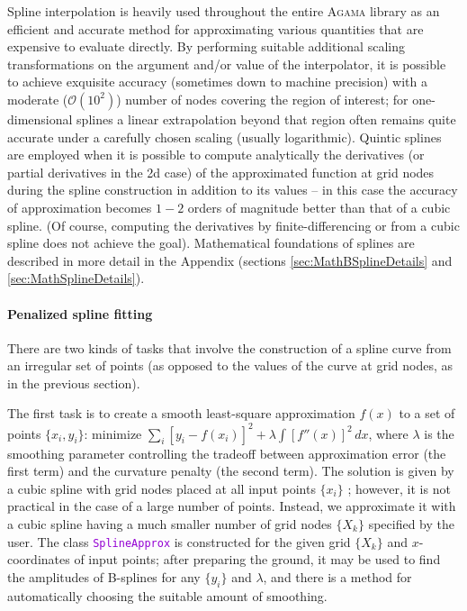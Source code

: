 \documentclass[12pt]{article}
\newcommand{\Agama}{\textsc{Agama}\xspace}
\newcommand{\ttt}[1]{\textcolor{darkviolet}{\texttt{#1}}}
\begin{document}
Spline interpolation is heavily used throughout the entire \Agama library as an efficient and accurate method for approximating various quantities that are expensive to evaluate directly. By performing suitable additional scaling transformations on the argument and/or value of the interpolator, it is possible to achieve exquisite accuracy (sometimes down to machine precision) with a moderate ($\mathcal O(10^2)$) number of nodes covering the region of interest; for one-dimensional splines a linear extrapolation beyond that region often remains quite accurate under a carefully chosen scaling (usually logarithmic). Quintic splines are employed when it is possible to compute analytically the derivatives (or partial derivatives in the 2d case) of the approximated function at grid nodes during the spline construction in addition to its values -- in this case the accuracy of approximation becomes $1-2$ orders of magnitude better than that of a cubic spline. (Of course, computing the derivatives by finite-differencing or from a cubic spline does not achieve the goal).
Mathematical foundations of splines are described in more detail in the Appendix (sections \ref{sec:MathBSplineDetails} and \ref{sec:MathSplineDetails}).

\paragraph{Penalized spline fitting}  \label{sec:SplineFitting}
There are two kinds of tasks that involve the construction of a spline curve from an irregular set of points (as opposed to the values of the curve at grid nodes, as in the previous section).

The first task is to create a smooth least-square approximation $f(x)$ to a set of points $\{x_i, y_i\}$: 
minimize $\sum_i [y_i-f(x_i)]^2 + \lambda \int [f''(x)]^2\,dx$, where $\lambda$ is the smoothing parameter controlling the tradeoff between approximation error (the first term) and the curvature penalty (the second term). The solution is given by a cubic spline with grid nodes placed at all input points $\{x_i\}$ \cite{GreenSilverman}; however, it is not practical in the case of a large number of points. Instead, we approximate it with a cubic spline having a much smaller number of grid nodes $\{X_k\}$ specified by the user. The class \ttt{SplineApprox} is constructed for the given grid  $\{X_k\}$ and $x$-coordinates of input points; after preparing the ground, it may be used to find the amplitudes of B-splines for any $\{y_i\}$ and $\lambda$, and there is a method for automatically choosing the suitable amount of smoothing.
\end{document}
